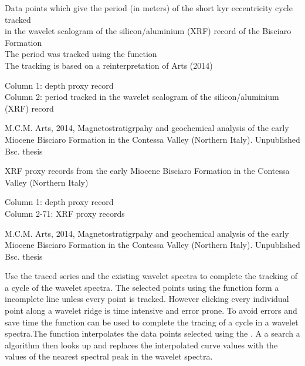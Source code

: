 \documentclass[a4paper]{book}
\begin{document}
%
\begin{Description}
Data points which give the period (in meters) of the short kyr eccentricity cycle tracked \\{}
in the wavelet scalogram of the silicon/aluminium (XRF) record of the Bisciaro Formation \\{}
The period was tracked using the  function\\{}
The tracking is based on a reinterpretation of Arts (2014)\\{}
\end{Description}
%
\begin{Details}
Column 1: depth proxy record\\{}
Column 2: period tracked in the wavelet scalogram of the silicon/aluminium (XRF) record
\end{Details}
%
\begin{References}
M.C.M. Arts, 2014,
Magnetostratigrpahy and geochemical analysis of the early Miocene Bisciaro Formation
in the Contessa Valley (Northern Italy). Unpublished Bsc. thesis \\{}
\end{References}
%
\begin{Description}
XRF proxy records from the early Miocene Bisciaro Formation
in the Contessa Valley (Northern Italy)
\end{Description}
%
\begin{Details}
Column 1: depth proxy record\\{}
Column 2-71: XRF proxy records
\end{Details}
%
\begin{References}
M.C.M. Arts, 2014,
Magnetostratigrpahy and geochemical analysis of the early Miocene Bisciaro Formation
in the Contessa Valley (Northern Italy). Unpublished Bsc. thesis \\{}
\end{References}
%
\begin{Description}
Use the traced series and the existing wavelet
spectra to complete the tracking of a cycle of the wavelet spectra.
The selected points using the  function form a incomplete line
unless every point is tracked. However clicking every individual point along a wavelet ridge is time
intensive and error prone.
To avoid errors and save time the  function can be used to
complete the tracing of a cycle in a wavelet spectra.The  function interpolates the
data points selected using the . A a search a algorithm then looks up and replaces
the interpolated curve values with the values of the nearest spectral peak in the wavelet spectra.
\end{Description}
\end{document}
